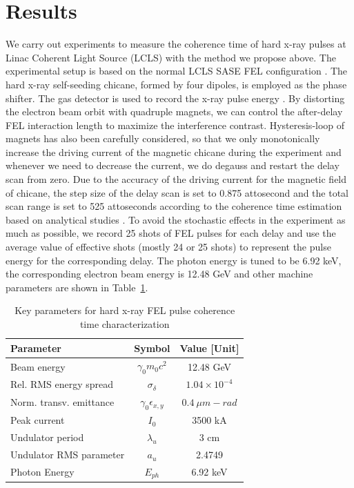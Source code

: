 \documentclass[%
 preprint,
 amsmath,amssymb,
 aps,
 prl,
 superscriptaddress,
 floatfix,
 letter,
]{revtex4-1}
\begin{document}
\section{Results}


We carry out experiments to measure the coherence time of hard x-ray pulses at Linac Coherent Light Source (LCLS) with the method we propose above. The experimental setup is based on the normal LCLS SASE FEL configuration  \cite{lclsRMP}. The hard x-ray self-seeding chicane, formed by four dipoles, is employed as the phase shifter. The gas detector is used to record the x-ray pulse energy \cite*{gas_detector2}. By distorting the electron beam orbit with quadruple magnets, we can control the after-delay FEL interaction length to maximize the interference contrast. Hysteresis-loop of magnets has also been carefully considered, so that we only monotonically increase the driving current of the magnetic chicane during the experiment and whenever we need to decrease the current, we do degauss and restart the delay scan from zero. Due to the accuracy of the driving current for the magnetic field of chicane, the step size of the delay scan is set to 0.875 attosecond and the total scan range is set to 525 attoseconds according to the coherence time estimation based on analytical studies \cite{saldin_book}. To avoid the stochastic effects in the experiment as much as possible, we record 25 shots of FEL pulses for each delay and use the average value of effective shots (mostly 24 or 25 shots) to represent the pulse energy for the corresponding delay. The photon energy is tuned to be 6.92 keV, the corresponding electron beam energy is 12.48 GeV and other machine parameters are shown in Table~\ref{Tab1}.

\begin{table}
        \centering
        \caption{ \label{Tab1} Key parameters for hard x-ray FEL pulse coherence time characterization}
        \begin{tabular}{lcc}
        \toprule
         Parameter  & Symbol  & Value [Unit] \\
        \hline
          Beam energy  &  $ \gamma_0 m_{0}c^{2} $ & 12.48 GeV \\
          Rel. RMS energy spread &  $\sigma_{\delta}$  & $1.04 \times 10^{-4} $    \\
          Norm. transv. emittance  & $ \gamma_{0} \epsilon_{x,y} $ & $ 0.4\ \mu m-rad$  \\
          Peak current  & $I_{0}$   & 3500 kA \\
          Undulator period   & $\lambda_{u} $  & 3 cm \\
          Undulator RMS parameter  & $a_{u}$ &  2.4749 \\
          Photon Energy  & $E_{ph} $ & 6.92 keV \\
        \hline
        \end{tabular}
\end{table}
\end{document}
